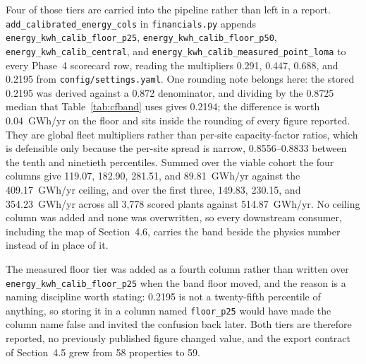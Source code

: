 \documentclass[12pt,letterpaper]{report}
\begin{document}
\begin{sloppypar}
Four of those tiers are carried into the pipeline rather than left in a report.
\texttt{add\_calibrated\_energy\_cols} in \texttt{financials.py} appends
\texttt{energy\_kwh\_calib\_floor\_p25}, \texttt{energy\_kwh\_calib\_floor\_p50},
\texttt{energy\_kwh\_calib\_central}, and
\texttt{energy\_kwh\_calib\_measured\_point\_loma} to every Phase~4 scorecard row,
reading the multipliers 0.291, 0.447, 0.688, and 0.2195 from
\texttt{config/settings.yaml}. One rounding note belongs here: the stored 0.2195
was derived against a 0.872 denominator, and dividing by the 0.8725 median that
Table~\ref{tab:cfband} uses gives 0.2194; the difference is worth 0.04~GWh/yr on
the floor and sits inside the rounding of every figure reported. They
are global fleet multipliers rather than per-site capacity-factor ratios, which
is defensible only because the per-site spread is narrow, 0.8556--0.8833 between
the tenth and ninetieth percentiles. Summed over the viable cohort the four
columns give 119.07, 182.90, 281.51, and 89.81~GWh/yr against the 409.17~GWh/yr
ceiling, and over the first three, 149.83, 230.15, and 354.23~GWh/yr across all
3{,}778 scored plants against 514.87~GWh/yr. No ceiling column was added and none
was overwritten, so every downstream consumer, including the map of Section~4.6,
carries the band beside the physics number instead of in place of it.

The measured floor tier was added as a fourth column rather than written over
\texttt{energy\_kwh\_calib\_floor\_p25} when the band floor moved, and the reason is a
naming discipline worth stating: 0.2195 is not a twenty-fifth percentile of anything, so
storing it in a column named \texttt{floor\_p25} would have made the column name false
and invited the confusion back later. Both tiers are therefore reported, no previously
published figure changed value, and the export contract of Section~4.5 grew from 58
properties to 59.
\end{sloppypar}
\end{document}

